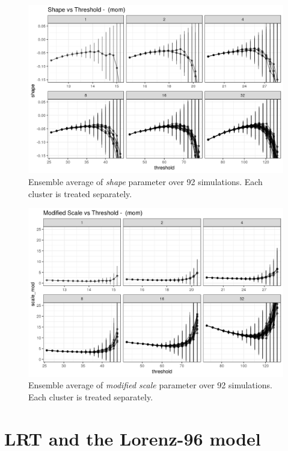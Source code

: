 \documentclass{article}
\begin{document}
\begin{figure}
	\includegraphics[width=\linewidth]{fig/shape_mom_RK401_1e7_maxt05_1e7.png}
	\caption{Ensemble average of \textit{shape} parameter over 92 simulations. Each cluster is treated separately.}
	\label{fig:shape_mom}
\end{figure}

\begin{figure}
	\includegraphics[width=\linewidth]{fig/modscale_mom_RK401_1e7_maxt05_1e7.png}
	\caption{Ensemble average of \textit{modified scale} parameter over 92 simulations. Each cluster is treated separately.}
	\label{fig:modscale_mom}
\end{figure}

\section{LRT and the Lorenz-96 model}
\end{document}
